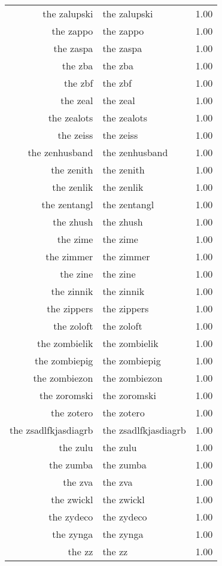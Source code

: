 \begin{table}[ht]
\begin{tabular}{rlr}
  the zalupski & the zalupski & 1.00 \\ 
  the zappo & the zappo & 1.00 \\ 
  the zaspa & the zaspa & 1.00 \\ 
  the zba & the zba & 1.00 \\ 
  the zbf & the zbf & 1.00 \\ 
  the zeal & the zeal & 1.00 \\ 
  the zealots & the zealots & 1.00 \\ 
  the zeiss & the zeiss & 1.00 \\ 
  the zenhusband & the zenhusband & 1.00 \\ 
  the zenith & the zenith & 1.00 \\ 
  the zenlik & the zenlik & 1.00 \\ 
  the zentangl & the zentangl & 1.00 \\ 
  the zhush & the zhush & 1.00 \\ 
  the zime & the zime & 1.00 \\ 
  the zimmer & the zimmer & 1.00 \\ 
  the zine & the zine & 1.00 \\ 
  the zinnik & the zinnik & 1.00 \\ 
  the zippers & the zippers & 1.00 \\ 
  the zoloft & the zoloft & 1.00 \\ 
  the zombielik & the zombielik & 1.00 \\ 
  the zombiepig & the zombiepig & 1.00 \\ 
  the zombiezon & the zombiezon & 1.00 \\ 
  the zoromski & the zoromski & 1.00 \\ 
  the zotero & the zotero & 1.00 \\ 
  the zsadlfkjasdiagrb & the zsadlfkjasdiagrb & 1.00 \\ 
  the zulu & the zulu & 1.00 \\ 
  the zumba & the zumba & 1.00 \\ 
  the zva & the zva & 1.00 \\ 
  the zwickl & the zwickl & 1.00 \\ 
  the zydeco & the zydeco & 1.00 \\ 
  the zynga & the zynga & 1.00 \\ 
  the zz & the zz & 1.00 \\ 
   \hline
\end{tabular}
\end{table}
